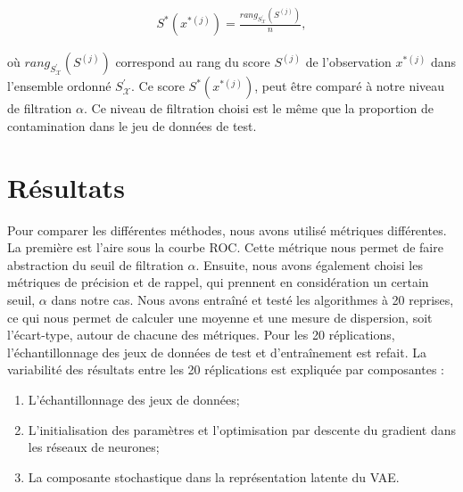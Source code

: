 \begin{gather}
	S^*(x^{*(j)}) = \frac{rang_{S^{'}_{\mathcal{X}}}(S^{(j)})}{n},
\end{gather}

où $rang_{S^{'}_{\mathcal{X}}}(S^{(j)})$ correspond au rang du score $S^{(j)}$ de l'observation $x^{*(j)}$ dans l'ensemble ordonné $S^{'}_{\mathcal{X}}$. Ce score $S^*(x^{*(j)})$, peut être comparé à notre niveau de filtration $\alpha$. Ce niveau de filtration choisi est le même que la proportion de contamination dans le jeu de données de test.

\section{Résultats} \label{exp:results}

Pour comparer les différentes méthodes, nous avons utilisé \DIFdelbegin {}\DIFdelend \DIFaddbegin {}\DIFaddend métriques différentes. La première est l'aire sous la courbe ROC. Cette métrique nous permet de faire abstraction du seuil de filtration $\alpha$. Ensuite, nous avons également choisi les métriques de précision et de rappel, qui prennent en considération un certain seuil, $\alpha$ dans notre cas. Nous avons entraîné et testé les algorithmes à 20 reprises, ce qui nous permet de calculer une moyenne et une mesure de dispersion, soit l'écart-type, autour de chacune des métriques. Pour les 20 réplications, l'échantillonnage des jeux de données de test et d'entraînement est refait. La variabilité des résultats entre les 20 réplications est expliquée par \DIFdelbegin {}\DIFdelend \DIFaddbegin {}\DIFaddend composantes :

\begin{enumerate}
	\item L'échantillonnage des jeux de données;
	\item L'initialisation des paramètres et l'optimisation par descente du gradient dans les réseaux de neurones;
	\item La composante stochastique dans la représentation latente du VAE.
\end{enumerate}

